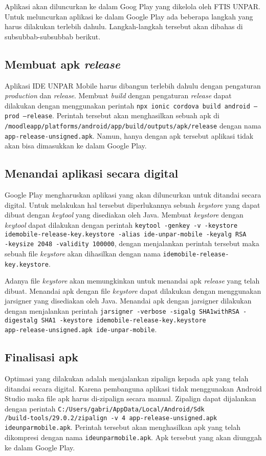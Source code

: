 Aplikasi akan diluncurkan ke dalam Goog Play yang dikelola oleh FTIS UNPAR. Untuk meluncurkan aplikasi ke dalam Google Play ada beberapa langkah yang harus dilakukan terlebih dahulu. Langkah-langkah tersebut akan dibahas di subsubbab-subsubbab berikut.

\subsection{Membuat apk \textit{release}}

Aplikasi IDE UNPAR Mobile harus dibangun terlebih dahulu dengan pengaturan \textit{production} dan \textit{release}. Membuat \textit{build} dengan pengaturan \textit{release} dapat dilakukan dengan menggunakan perintah \texttt{npx ionic cordova build android --prod --release}. Perintah tersebut akan menghasilkan sebuah apk di \texttt{/moodleapp/platforms/android/app/build/outputs/apk/release} dengan nama \texttt{app-release-unsigned.apk}. Namun, hanya dengan apk tersebut aplikasi tidak akan bisa dimasukkan ke dalam Google Play.

\subsection{Menandai aplikasi secara digital}
Google Play mengharuskan aplikasi yang akan diluncurkan untuk ditandai secara digital. Untuk melakukan hal tersebut diperlukannya sebuah \textit{keystore} yang dapat dibuat dengan \textit{keytool} yang disediakan oleh Java. Membuat \textit{keystore} dengan \textit{keytool} dapat dilakukan dengan perintah \texttt{keytool -genkey -v -keystore idemobile-release-key.keystore -alias ide-unpar-mobile -keyalg RSA \\ -keysize 2048 -validity 100000}, dengan menjalankan perintah tersebut maka sebuah file \textit{keystore} akan dihasilkan dengan nama \texttt{idemobile-release-key.keystore}.

Adanya file \textit{keystore} akan memungkinkan untuk menandai apk \textit{release} yang telah dibuat. Menandai apk dengan file \textit{keystore} dapat dilakukan dengan menggunakan jarsigner yang disediakan oleh Java. Menandai apk dengan jarsigner dilakukan dengan menjalankan perintah \texttt{jarsigner -verbose -sigalg SHA1withRSA -digestalg SHA1 -keystore idemobile-release-key.keystore \\ app-release-unsigned.apk ide-unpar-mobile}. 

\subsection{Finalisasi apk}
Optimasi yang dilakukan adalah menjalankan zipalign kepada apk yang telah ditandai secara digital. Karena pembanguna aplikasi tidak menggunakan Android Studio maka file apk harus di-zipalign secara manual. Zipalign dapat dijalankan dengan perintah \texttt{C:/Users/gabri/AppData/Local/Android/Sdk\\/build-tools/29.0.2/zipalign -v 4 app-release-unsigned.apk ideunparmobile.apk}. Perintah tersebut akan menghasilkan apk yang telah dikompresi dengan nama \texttt{ideunparmobile.apk}. Apk tersebut yang akan diunggah ke dalam Google Play.

